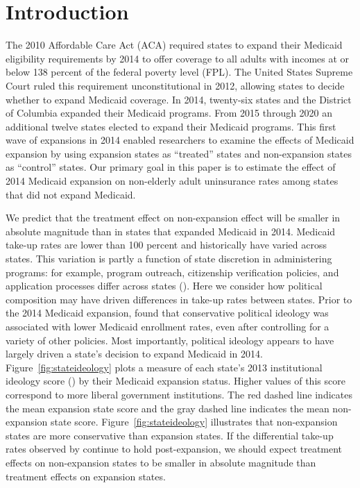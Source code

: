 \documentclass[aoas]{imsart}
\theoremstyle{plain}
\theoremstyle{remark}
\begin{document}

\section{Introduction}

The 2010 Affordable Care Act (ACA) required states to expand their Medicaid eligibility requirements by 2014 to offer coverage to all adults with incomes at or below 138 percent of the federal poverty level (FPL). The United States Supreme Court ruled this requirement unconstitutional in 2012, allowing states to decide whether to expand Medicaid coverage. In 2014, twenty-six states and the District of Columbia expanded their Medicaid programs. From 2015 through 2020 an additional twelve states elected to expand their Medicaid programs. This first wave of expansions in 2014 enabled researchers to examine the effects of Medicaid expansion by using expansion states as ``treated'' states and non-expansion states as ``control'' states. Our primary goal in this paper is to estimate the effect of 2014 Medicaid expansion on non-elderly adult uninsurance rates among states that did not expand Medicaid.

We predict that the treatment effect on non-expansion effect will be smaller in absolute magnitude than in states that expanded Medicaid in 2014. Medicaid take-up rates are lower than 100 percent and historically have varied across states. This variation is partly a function of state discretion in administering programs: for example, program outreach, citizenship verification policies, and application processes differ across states (\cite{courtemanche2017early}). Here we consider how political composition may have driven differences in take-up rates between states. Prior to the 2014 Medicaid expansion, \cite{sommers2012understanding} found that conservative political ideology was associated with lower Medicaid enrollment rates, even after controlling for a variety of other policies. Most importantly, political ideology appears to have largely driven a state's decision to expand Medicaid in 2014. Figure~\ref{fig:stateideology} plots a measure of each state's 2013 institutional ideology score (\cite{berry1998measuring}) by their Medicaid expansion status. Higher values of this score correspond to more liberal government institutions. The red dashed line indicates the mean expansion state score and the gray dashed line indicates the mean non-expansion state score. Figure~\ref{fig:stateideology} illustrates that non-expansion states are more conservative than expansion states. If the differential take-up rates observed by \cite{sommers2012understanding} continue to hold post-expansion, we should expect treatment effects on non-expansion states to be smaller in absolute magnitude than treatment effects on expansion states. 
\end{document}
